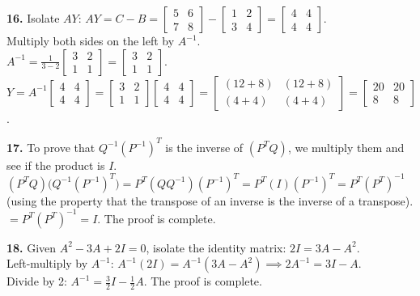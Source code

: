 \documentclass{article}
\begin{document}
\vspace{5pt}
\noindent
\textbf{16.} Isolate $AY$: $AY = C - B = \begin{bmatrix} 5 & 6 \\ 7 & 8 \end{bmatrix} - \begin{bmatrix} 1 & 2 \\ 3 & 4 \end{bmatrix} = \begin{bmatrix} 4 & 4 \\ 4 & 4 \end{bmatrix}$. \\
Multiply both sides on the left by $A^{-1}$. \\
$A^{-1} = \frac{1}{3-2} \begin{bmatrix} 3 & 2 \\ 1 & 1 \end{bmatrix} = \begin{bmatrix} 3 & 2 \\ 1 & 1 \end{bmatrix}$. \\
$Y = A^{-1} \begin{bmatrix} 4 & 4 \\ 4 & 4 \end{bmatrix} = \begin{bmatrix} 3 & 2 \\ 1 & 1 \end{bmatrix} \begin{bmatrix} 4 & 4 \\ 4 & 4 \end{bmatrix} = \begin{bmatrix} (12+8) & (12+8) \\ (4+4) & (4+4) \end{bmatrix} = \begin{bmatrix} 20 & 20 \\ 8 & 8 \end{bmatrix}$.

\vspace{5pt}
\noindent
\textbf{17.} To prove that $Q^{-1} (P^{-1})^T$ is the inverse of $(P^T Q)$, we multiply them and see if the product is $I$. \\
$(P^T Q) \big(Q^{-1} (P^{-1})^T \big) = P^T (Q Q^{-1}) (P^{-1})^T = P^T (I) (P^{-1})^T = P^T (P^T)^{-1}$ (using the property that the transpose of an inverse is the inverse of a transpose). \\
$= P^T (P^T)^{-1} = I$. The proof is complete.

\vspace{5pt}
\noindent
\textbf{18.} Given $A^2 - 3A + 2I = 0$, isolate the identity matrix: $2I = 3A - A^2$. \\
Left-multiply by $A^{-1}$: $A^{-1}(2I) = A^{-1}(3A - A^2) \implies 2A^{-1} = 3I - A$. \\
Divide by 2: $A^{-1} = \frac{3}{2}I - \frac{1}{2}A$. The proof is complete.
\end{document}
